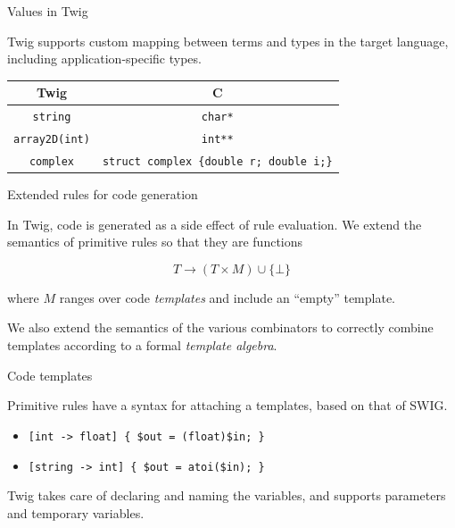 \documentclass{beamer}
\begin{document}
\begin{frame}{Values in Twig}

Twig supports custom mapping between terms and types in the target language,
including application-specific types.

\begin{center}
\begin{tabular}{c | c}
  Twig                  & C \\
  \hline                       
  \texttt{string}       & \texttt{char*} \\
  \texttt{array2D(int)} & \texttt{int**} \\
  \texttt{complex}      & \texttt{struct complex \{double r; double i;\}} \\
\end{tabular}
\end{center}

\end{frame}


\begin{frame}{Extended rules for code generation}

In Twig, code is generated as a side effect of rule evaluation. We extend the
semantics of primitive rules so that they are functions

\[
T \to (T \times M) \cup \{\bot\}
\]

where $M$ ranges over code \emph{templates} and include an ``empty'' template.

We also extend the semantics of the various combinators to correctly combine
templates according to a formal \emph{template algebra}.

\end{frame}


\begin{frame}{Code templates}

Primitive rules have a syntax for attaching a templates, based on that of
SWIG.

\begin{itemize}
  \item \texttt{[int -> float] \{ \$out = (float)\$in; \}}
  \item \texttt{[string -> int] \{ \$out = atoi(\$in); \}}
\end{itemize}  

Twig takes care of declaring and naming the variables, and supports parameters
and temporary variables.

\end{frame}
\end{document}
